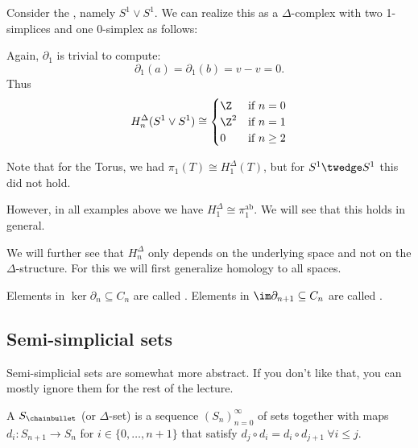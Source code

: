 \begin{example}
    Consider the , namely $S^1 \vee S^1$. We can realize this as a $\Delta$-complex with two 1-simplices and one 0-simplex as follows:

    Again, $\partial_1$ is trivial to compute:
     \[
         \partial_1(a) = \partial_1(b) = v - v = 0.
    \] 
    Thus
    \[
        H_n^{\Delta}(S^1 \vee S^1) \cong \begin{cases}
            \Z &\text{if } n = 0\\
            \Z^2 &\text{if } n = 1\\
            0 &\text{if } n \ge 2
        \end{cases}
    \] 
\end{example}

\begin{remark}
    Note that for the Torus, we had  $\pi_1(T) \cong H_1^{\Delta}(T)$, but for $S^1 \twedge S^1$ this did not hold.

    However, in all examples above we have $H_1^\Delta \cong \pi_1^{\text{ab}}$.
    We will see that this holds in general.

    We will further see that $H_n^\Delta$ only depends on the underlying space and not on the $\Delta$-structure. For this we will first generalize homology to all spaces.
\end{remark}

\begin{definition}\label{def:cycles-boundaries}
    Elements in $\ker \partial_n \subseteq C_n$ are called .
    Elements in $\im \partial_{n+1} \subseteq C_n$ are called .
    
\end{definition}

\subsection{Semi-simplicial sets}

\begin{oral}
    Semi-simplicial sets are somewhat more abstract. If you don't like that, you can mostly ignore them for the rest of the lecture.
\end{oral}

\begin{definition}\label{def:semi-simplicial-set}
    A  $S_\chainbullet$ (or $\Delta$-set) is a sequence $(S_n)_{n=0}^\infty$ of sets together with maps
    $d_i : S_{n+1} \to  S_n$ for $i \in  \{0,\ldots, n+1\}$ that satisfy $d_j \circ d_{i} = d_i \circ d_{j+1} ~\forall i \le j$.
\end{definition}

